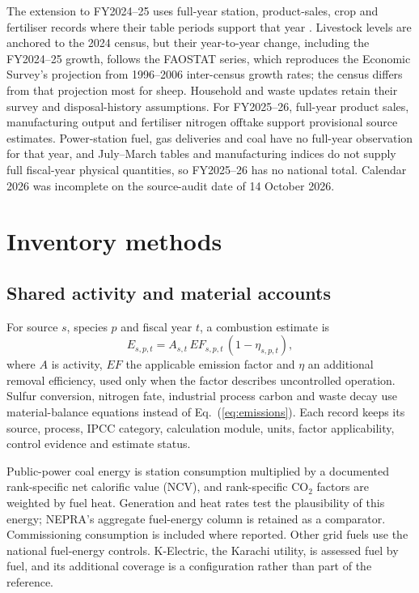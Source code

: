 \documentclass[essd,manuscript]{copernicus}
\begin{document}


The extension to FY2024--25 uses full-year station, product-sales, crop and fertiliser records where their table periods support that year \citep{NEPRA2025,MoF2026,NFDC2025,OCAC2026}. Livestock levels are anchored to the 2024 census, but their year-to-year change, including the FY2024--25 growth, follows the FAOSTAT series, which reproduces the Economic Survey's projection from 1996--2006 inter-census growth rates; the census differs from that projection most for sheep. Household and waste updates retain their survey and disposal-history assumptions. For FY2025--26, full-year product sales, manufacturing output and fertiliser nitrogen offtake support provisional source estimates. Power-station fuel, gas deliveries and coal have no full-year observation for that year, and July--March tables and manufacturing indices do not supply full fiscal-year physical quantities, so FY2025--26 has no national total. Calendar 2026 was incomplete on the source-audit date of 14 October 2026.

\section{Inventory methods}
\label{sec:methods}
\subsection{Shared activity and material accounts}
For source $s$, species $p$ and fiscal year $t$, a combustion estimate is
\begin{equation}
 E_{s,p,t}=A_{s,t}\,EF_{s,p,t}\,(1-\eta_{s,p,t}),
 \label{eq:emissions}
\end{equation}
where $A$ is activity, $EF$ the applicable emission factor and $\eta$ an additional removal efficiency, used only when the factor describes uncontrolled operation. Sulfur conversion, nitrogen fate, industrial process carbon and waste decay use material-balance equations instead of Eq.~(\ref{eq:emissions}). Each record keeps its source, process, IPCC category, calculation module, units, factor applicability, control evidence and estimate status.

Public-power coal energy is station consumption multiplied by a documented rank-specific net calorific value (NCV), and rank-specific CO$_2$ factors are weighted by fuel heat. Generation and heat rates test the plausibility of this energy; NEPRA's aggregate fuel-energy column is retained as a comparator. Commissioning consumption is included where reported. Other grid fuels use the national fuel-energy controls. K-Electric, the Karachi utility, is assessed fuel by fuel, and its additional coverage is a configuration rather than part of the reference.
\end{document}
